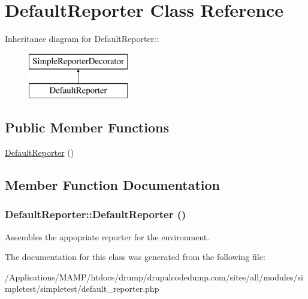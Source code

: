 \hypertarget{class_default_reporter}{
\section{DefaultReporter Class Reference}
\label{class_default_reporter}
}
Inheritance diagram for DefaultReporter::\begin{figure}[H]
\begin{center}
\leavevmode
\includegraphics[height=2cm]{class_default_reporter}
\end{center}
\end{figure}
\subsection*{Public Member Functions}
\begin{DoxyCompactItemize}
\item 
\hyperlink{class_default_reporter_adbd07b838e321696a65463a980529a78}{DefaultReporter} ()
\end{DoxyCompactItemize}


\subsection{Member Function Documentation}
\hypertarget{class_default_reporter_adbd07b838e321696a65463a980529a78}{
\subsubsection[{DefaultReporter}]{\setlength{\rightskip}{0pt plus 5cm}DefaultReporter::DefaultReporter ()}}
\label{class_default_reporter_adbd07b838e321696a65463a980529a78}
Assembles the appopriate reporter for the environment. 

The documentation for this class was generated from the following file:\begin{DoxyCompactItemize}
\item 
/Applications/MAMP/htdocs/drump/drupalcodedump.com/sites/all/modules/simpletest/simpletest/default\_\-reporter.php\end{DoxyCompactItemize}
